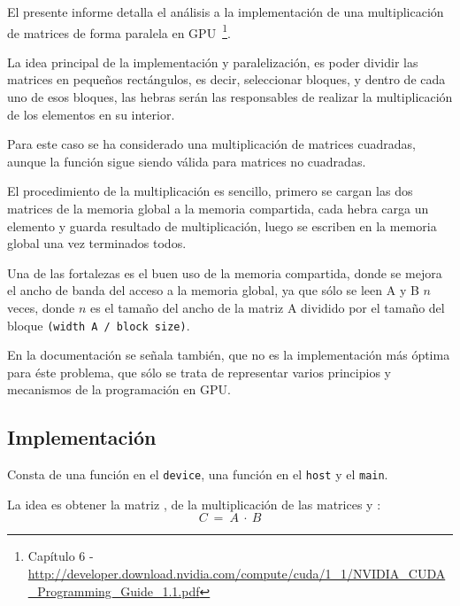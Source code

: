 El presente informe detalla el análisis a la implementación
de una multiplicación de matrices de forma paralela en GPU~\footnote{
Capítulo 6 - \url{http://developer.download.nvidia.com/compute/cuda/1_1/NVIDIA_CUDA_Programming_Guide_1.1.pdf} 
}.

La idea principal de la implementación y paralelización,
es poder dividir las matrices en pequeños rectángulos,
es decir, seleccionar bloques, y dentro de cada uno de esos bloques,
las hebras serán las responsables de realizar la multiplicación
de los elementos en su interior.

Para este caso se ha considerado una multiplicación de matrices
cuadradas, aunque la función sigue siendo válida para matrices
no cuadradas.

El procedimiento de la multiplicación es sencillo,
primero se cargan las dos matrices de la memoria global a la memoria compartida,
cada hebra carga un elemento y guarda resultado de multiplicación,
luego se escriben en la memoria global una vez terminados todos.

Una de las fortalezas es el buen uso de la memoria compartida,
donde se mejora el ancho de banda del acceso a la memoria global,
ya que sólo se leen A y B $n$ veces, donde $n$ es el tamaño del ancho de la matriz
A dividido por el tamaño del bloque \texttt{(width A / block size)}.

En la documentación se señala también,
que no es la implementación más óptima para éste problema,
que sólo se trata de representar varios principios y mecanismos
de la programación en GPU.

\subsection{Implementación}

Consta de una función en el \texttt{device},
una función en el \texttt{host} y el \texttt{main}.

La idea es obtener la matriz , de la multiplicación de las matrices  y :
$$C\ =\ A\ \cdot\ B$$

